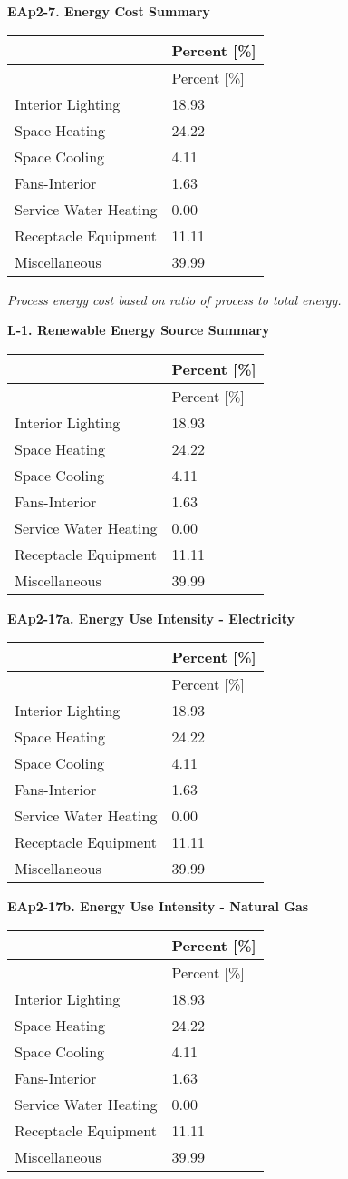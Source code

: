 \textbf{EAp2-7. Energy Cost Summary}

\begin{longtable}[c]{@{}ll@{}}
\toprule 
 & Percent [\%] \tabularnewline
\midrule
\endfirsthead

\toprule 
 & Percent [\%] \tabularnewline
\midrule
\endhead

Interior Lighting & 18.93 \tabularnewline
Space Heating & 24.22 \tabularnewline
Space Cooling & 4.11 \tabularnewline
Fans-Interior & 1.63 \tabularnewline
Service Water Heating & 0.00 \tabularnewline
Receptacle Equipment & 11.11 \tabularnewline
Miscellaneous & 39.99 \tabularnewline
\bottomrule
\end{longtable}

\emph{Process energy cost based on ratio of process to total energy.}

\textbf{L-1. Renewable Energy Source Summary}

\begin{longtable}[c]{@{}ll@{}}
\toprule 
 & Percent [\%] \tabularnewline
\midrule
\endfirsthead

\toprule 
 & Percent [\%] \tabularnewline
\midrule
\endhead

Interior Lighting & 18.93 \tabularnewline
Space Heating & 24.22 \tabularnewline
Space Cooling & 4.11 \tabularnewline
Fans-Interior & 1.63 \tabularnewline
Service Water Heating & 0.00 \tabularnewline
Receptacle Equipment & 11.11 \tabularnewline
Miscellaneous & 39.99 \tabularnewline
\bottomrule
\end{longtable}

\textbf{EAp2-17a. Energy Use Intensity - Electricity}

\begin{longtable}[c]{@{}ll@{}}
\toprule 
 & Percent [\%] \tabularnewline
\midrule
\endfirsthead

\toprule 
 & Percent [\%] \tabularnewline
\midrule
\endhead

Interior Lighting & 18.93 \tabularnewline
Space Heating & 24.22 \tabularnewline
Space Cooling & 4.11 \tabularnewline
Fans-Interior & 1.63 \tabularnewline
Service Water Heating & 0.00 \tabularnewline
Receptacle Equipment & 11.11 \tabularnewline
Miscellaneous & 39.99 \tabularnewline
\bottomrule
\end{longtable}

\textbf{EAp2-17b. Energy Use Intensity - Natural Gas}

\begin{longtable}[c]{@{}ll@{}}
\toprule 
 & Percent [\%] \tabularnewline
\midrule
\endfirsthead

\toprule 
 & Percent [\%] \tabularnewline
\midrule
\endhead

Interior Lighting & 18.93 \tabularnewline
Space Heating & 24.22 \tabularnewline
Space Cooling & 4.11 \tabularnewline
Fans-Interior & 1.63 \tabularnewline
Service Water Heating & 0.00 \tabularnewline
Receptacle Equipment & 11.11 \tabularnewline
Miscellaneous & 39.99 \tabularnewline
\bottomrule
\end{longtable}


